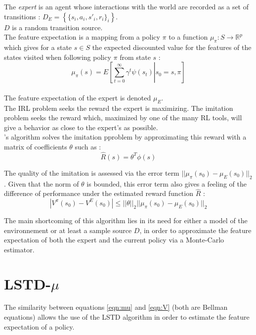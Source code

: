 \documentclass{article}
\begin{document}
The \emph{expert} is an agent whose interactions with the world are recorded as a set of transitions : $D_E = \left\{\{s_i,a_i,s'_i,r_i\}_i\right\}$.\\

$D$ is a random transition source.\\

The feature expectation is a mapping from a policy $\pi$ to a function $\mu_\pi : S \rightarrow \mathbb{R}^p$ which gives for a state $s\in S$ the expected discounted value for the features of the states visited when following policy $\pi$ from state $s$ :
\begin{equation}
\mu_\pi(s) = E\left[\left.\sum\limits_{t=0}^{\infty}\gamma^t\psi(s_t)\right|s_0=s,\pi\right]
\label{eqn:mu}
\end{equation}\\
The feature expectation of the expert is denoted $\mu_E$.\\

The IRL problem seeks the reward the expert is maximizing. The imitation problem seeks the reward which, maximized by one of the many RL tools, will give a behavior as close to the expert's as possible.\\

\citet{abbeel2004apprenticeship}'s algorithm solves the imitation pproblem by approximating this reward with a matrix of coefficients $\theta$ such as :
\begin{equation}
\hat R(s) = \theta^T\phi(s)
\end{equation}

The quality of the imitation is assessed via the error term $||\mu_\pi(s_0)-\mu_E(s_0)||_2$. Given that the norm of $\theta$ is bounded, this error term also gives a feeling of the difference of performance under the estimated reward function $\hat R$ :
\begin{equation}
|V^\pi(s_0)-V^E(s_0)| \leq ||\theta||_2||\mu_\pi(s_0)-\mu_E(s_0)||_2
\end{equation}

The main shortcoming of this algorithm lies in its need for either a model of the environnement or at least a sample source $D$, in order to approximate the feature expectation of both the expert and the current policy via a Monte-Carlo estimator.
\section{LSTD-$\mu$}
The similarity between equations \ref{eqn:mu} and \ref{eqn:V} (both are Bellman equations) allows the use of the LSTD algorithm in order to estimate the feature expectation of a policy.\\
\end{document}
